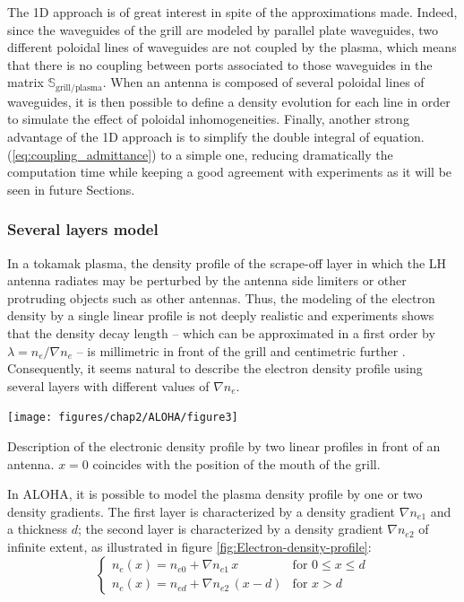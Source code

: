 The 1D approach is of great interest in spite of the approximations made. Indeed, since the waveguides of the grill are modeled by parallel plate waveguides, two different poloidal lines of waveguides are not coupled by the plasma, which means that there is no coupling between ports associated to those waveguides in the matrix $\mathbb{S}_{\mbox{grill/plasma}}$. When an antenna is composed of several poloidal lines of waveguides, it is then possible to define a density evolution for each line in order to simulate the effect of poloidal inhomogeneities. Finally, another strong advantage of the 1D approach is to simplify the double integral of equation.(\ref{eq:coupling_admittance}) to a simple one, reducing dramatically the computation time while keeping a good agreement with experiments as it will be seen in future Sections.


\subsubsection{Several layers model}\label{sec_several_layers_model}

In a tokamak plasma, the density profile of the scrape-off layer in which the LH antenna radiates may be perturbed by the antenna side limiters or other protruding objects such as other antennas. Thus, the modeling of the electron density by a single linear profile is not deeply realistic and experiments shows that the density decay length -- which can be approximated in a first order by $\lambda=n_{e}/\nabla n_{e}$  -- is millimetric in front of the grill and centimetric further . Consequently, it seems natural to describe the electron density profile using several layers with different values of $\nabla n_{e}$.

\begin{marginfigure}
	\texttt{[image: figures/chap2/ALOHA/figure3]}
	\caption{Description of the electronic density profile by two linear profiles
		in front of an antenna. $x=0$ coincides with the position of the
		mouth of the grill.\label{fig:Electron-density-profile} }
\end{marginfigure}

In ALOHA, it is possible to model the plasma density profile by one or two density gradients. The first layer is characterized by a density gradient $\nabla n_{e1}$ and a thickness $d$; the second layer is characterized by a density gradient $\nabla n_{e2}$ of infinite extent, as illustrated in figure \ref{fig:Electron-density-profile}: 
\begin{equation}
\left\{ 
\begin{array}{ll}
n_{e}\left(x\right)=n_{e0}+\nabla n_{e1}\, x & \mbox{for } 0\leq x\leq d\\
n_{e}\left(x\right)=n_{ed}+\nabla n_{e2}\,\left(x-d\right) & \mbox{for }  x>d
\end{array}
\right.
\label{eq:density_profile}
\end{equation}

